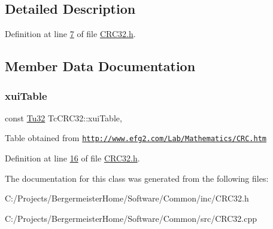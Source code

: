 \subsection{Detailed Description}


Definition at line \mbox{\hyperlink{_c_r_c32_8h_source_l00007}{7}} of file \mbox{\hyperlink{_c_r_c32_8h_source}{C\+R\+C32.\+h}}.



\subsection{Member Data Documentation}
\mbox{\label{class_g_n_common_1_1_tc_c_r_c32_a2c841dc8051fc7e1719224929f24b32d}} 
\subsubsection{\texorpdfstring{xui\+Table}{xuiTable}}
{\footnotesize\ttfamily const \mbox{\hyperlink{namespace_g_n_common_a941b527ef318f318aed7903dc832b7e4}{Tu32}} Tc\+C\+R\+C32\+::xui\+Table\hspace{0.3cm}{\ttfamily [static]}, {\ttfamily [protected]}}

Table obtained from \href{http://www.efg2.com/Lab/Mathematics/CRC.htm}{\tt http\+://www.\+efg2.\+com/\+Lab/\+Mathematics/\+C\+R\+C.\+htm} 

Definition at line \mbox{\hyperlink{_c_r_c32_8h_source_l00016}{16}} of file \mbox{\hyperlink{_c_r_c32_8h_source}{C\+R\+C32.\+h}}.



The documentation for this class was generated from the following files\+:\begin{DoxyCompactItemize}
\item 
C\+:/\+Projects/\+Bergermeister\+Home/\+Software/\+Common/inc/C\+R\+C32.\+h\item 
C\+:/\+Projects/\+Bergermeister\+Home/\+Software/\+Common/src/C\+R\+C32.\+cpp\end{DoxyCompactItemize}
